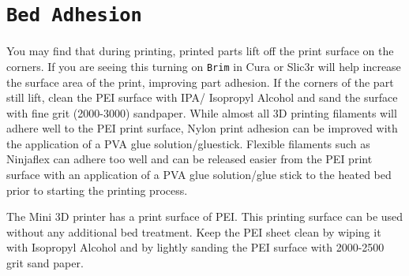 \section{\texttt{Bed Adhesion}}
You may find that during printing, printed parts lift off the print surface on the corners. If you are seeing this turning on \texttt{Brim} in Cura or Slic3r will help increase the surface area of the print, improving part adhesion. If the corners of the part still lift, clean the PEI surface with IPA/ Isopropyl Alcohol and sand the surface with fine grit (2000-3000) sandpaper. While almost all 3D printing filaments will adhere well to the PEI print surface, Nylon print adhesion can be improved with the application of a PVA glue solution/gluestick. Flexible filaments such as Ninjaflex\textsuperscript{\miniscule{\textregistered}} can adhere too well and can be released easier from the PEI print surface with an application of a PVA glue solution/glue stick to the heated bed prior to starting the printing process.






The Mini 3D printer has a print surface of PEI. This printing surface can be used without any additional bed treatment. Keep the PEI sheet clean by wiping it with Isopropyl Alcohol and by lightly sanding the PEI surface with 2000-2500 grit sand paper.

